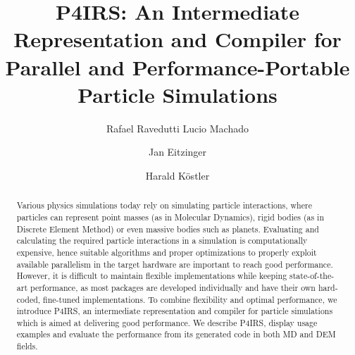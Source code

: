 \documentclass[preprint,12pt]{elsarticle}
\begin{document}
\begin{frontmatter}



\title{P4IRS: An Intermediate Representation and Compiler for Parallel and Performance-Portable Particle Simulations}


\author[nhratfau]{Rafael Ravedutti Lucio Machado}
\author[nhratfau]{Jan Eitzinger}
\author[nhratfau]{Harald Köstler}

\affiliation[nhratfau]{
	organization={Erlangen National High Performance Computing Center}, %
	addressline={Martensstraße 1},
	city={Erlangen},
	postcode={91058},
	state={Bayern},
	country={Germany}}

\begin{abstract}
Various physics simulations today rely on simulating particle interactions, where particles can represent point masses (as in Molecular Dynamics), rigid bodies (as in Discrete Element Method) or even massive bodies such as planets.
Evaluating and calculating the required particle interactions in a simulation is computationally expensive, hence suitable algorithms and proper optimizations to properly exploit available parallelism in the target hardware are important to reach good performance.
However, it is difficult to maintain flexible implementations while keeping state-of-the-art performance, as most packages are developed individually and have their own hard-coded, fine-tuned implementations.
To combine flexibility and optimal performance, we introduce P4IRS, an intermediate representation and compiler for particle simulations which is aimed at delivering good performance.
We describe P4IRS, display usage examples and evaluate the performance from its generated code in both MD and DEM fields.
\end{abstract}


\end{frontmatter}
\end{document}
